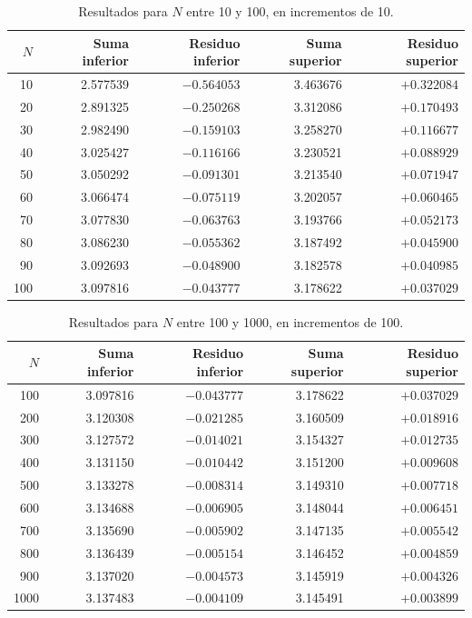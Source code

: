 \begin{table}[H]
\centering
\caption{Resultados para \(N\) entre 10 y 100, en incrementos de 10.}
\label{tab:10a100}
\small
\begin{tabular}{r r r r r}
\toprule
\(N\) & Suma inferior & Residuo inferior & Suma superior & Residuo superior \\
\midrule
10  & 2.577539 & \(-0.564053\) & 3.463676 & \(+0.322084\) \\
20  & 2.891325 & \(-0.250268\) & 3.312086 & \(+0.170493\) \\
30  & 2.982490 & \(-0.159103\) & 3.258270 & \(+0.116677\) \\
40  & 3.025427 & \(-0.116166\) & 3.230521 & \(+0.088929\) \\
50  & 3.050292 & \(-0.091301\) & 3.213540 & \(+0.071947\) \\
60  & 3.066474 & \(-0.075119\) & 3.202057 & \(+0.060465\) \\
70  & 3.077830 & \(-0.063763\) & 3.193766 & \(+0.052173\) \\
80  & 3.086230 & \(-0.055362\) & 3.187492 & \(+0.045900\) \\
90  & 3.092693 & \(-0.048900\) & 3.182578 & \(+0.040985\) \\
100 & 3.097816 & \(-0.043777\) & 3.178622 & \(+0.037029\) \\
\bottomrule
\end{tabular}
\end{table}

\begin{table}[H]
\centering
\caption{Resultados para \(N\) entre 100 y 1000, en incrementos de 100.}
\label{tab:100a1000}
\small
\begin{tabular}{r r r r r}
\toprule
\(N\) & Suma inferior & Residuo inferior & Suma superior & Residuo superior \\
\midrule
100  & 3.097816 & \(-0.043777\) & 3.178622 & \(+0.037029\) \\
200  & 3.120308 & \(-0.021285\) & 3.160509 & \(+0.018916\) \\
300  & 3.127572 & \(-0.014021\) & 3.154327 & \(+0.012735\) \\
400  & 3.131150 & \(-0.010442\) & 3.151200 & \(+0.009608\) \\
500  & 3.133278 & \(-0.008314\) & 3.149310 & \(+0.007718\) \\
600  & 3.134688 & \(-0.006905\) & 3.148044 & \(+0.006451\) \\
700  & 3.135690 & \(-0.005902\) & 3.147135 & \(+0.005542\) \\
800  & 3.136439 & \(-0.005154\) & 3.146452 & \(+0.004859\) \\
900  & 3.137020 & \(-0.004573\) & 3.145919 & \(+0.004326\) \\
1000 & 3.137483 & \(-0.004109\) & 3.145491 & \(+0.003899\) \\
\bottomrule
\end{tabular}
\end{table}

